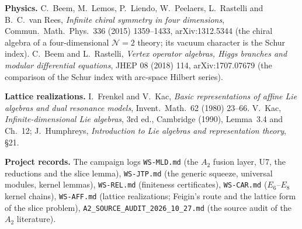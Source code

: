\textbf{Physics.} C.~Beem, M.~Lemos, P.~Liendo, W.~Peelaers, L.~Rastelli and B.~C.~van Rees, \emph{Infinite chiral symmetry in four
dimensions}, Commun.\ Math.\ Phys.\ 336 (2015) 1359--1433, arXiv:1312.5344 (the chiral algebra of a four-dimensional $\mathcal N=2$
theory; its vacuum character is the Schur index). C.~Beem and L.~Rastelli, \emph{Vertex operator algebras, Higgs branches and modular
differential equations}, JHEP 08 (2018) 114, arXiv:1707.07679 (the comparison of the Schur index with arc-space Hilbert series).

\textbf{Lattice realizations.} I.~Frenkel and V.~Kac, \emph{Basic representations of affine Lie algebras and dual resonance models}, Invent.\
Math.\ 62 (1980) 23--66. V.~Kac, \emph{Infinite-dimensional Lie algebras}, 3rd ed., Cambridge (1990), Lemma~3.4 and Ch.~12; J.~Humphreys,
\emph{Introduction to Lie algebras and representation theory}, \S21.

\textbf{Project records.} The campaign logs \texttt{WS-MLD.md}
(the $A_2$ fusion layer, U7, the reductions and the slice lemma), \texttt{WS-JTP.md} (the generic squeeze, universal modules,
kernel lemmas), \texttt{WS-REL.md} (finiteness certificates), \texttt{WS-CAR.md} ($E_6$--$E_8$ kernel chains),
\texttt{WS-AFF.md} (lattice realizations; Feigin's route and the lattice form of the slice problem),
\texttt{A2\_SOURCE\_AUDIT\_2026\_10\_27.md} (the source audit of the $A_2$ literature).

\endgroup
